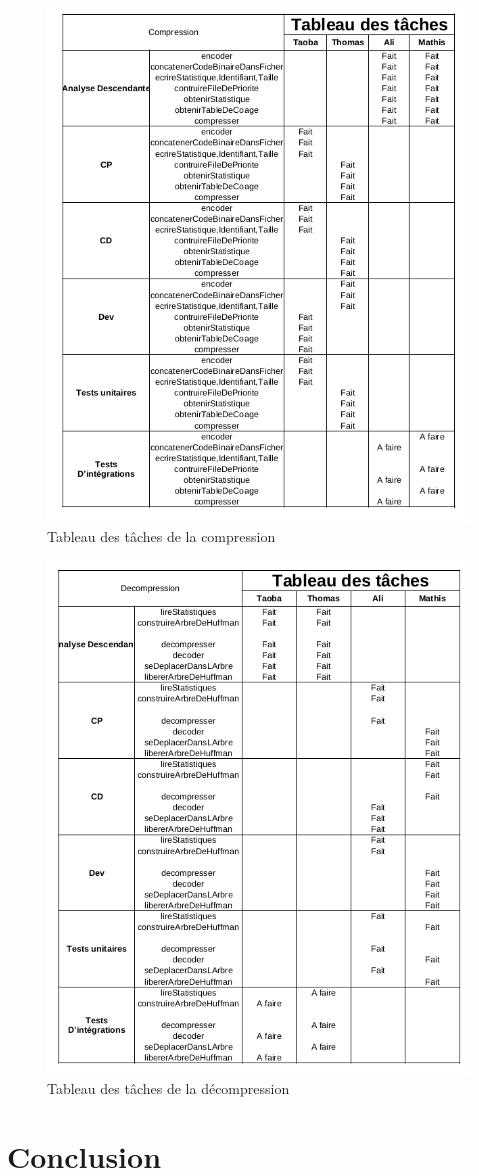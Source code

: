 \documentclass[10pt]{report}
\begin{document}
		\begin{figure}[h] 
   			 \centering      
    		\includegraphics[width=1.1\textwidth]{compressionTableau.png}
    		\caption{Tableau des tâches de la compression}
    		\label{fig:exemple}
		\end{figure}
		\begin{figure}[h] 
   			 \centering      
    		\includegraphics[width=1.1\textwidth]{decompressionTableau.png}
    		\caption{Tableau des tâches de la décompression}
    		\label{fig:exemple}
		\end{figure}
        \chapter{Conclusion}
\end{document}
